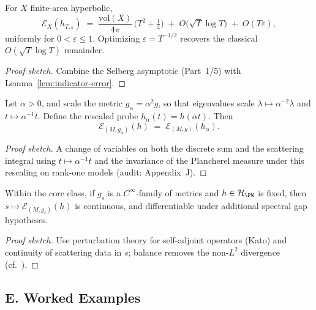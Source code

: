 \begin{theorem}
\label{thm:balanced-selberg}
For $X$ finite-area hyperbolic,
\[
  \mathcal E_X(h_{T,\varepsilon})
  \;=\; \frac{\mathrm{vol}(X)}{4\pi}\,\big(T^2+\tfrac14\big)
  \;+\; O\!\big(\sqrt{T}\log T\big) \;+\; O(T\varepsilon),
\]
uniformly for $0<\varepsilon\le 1$. Optimizing $\varepsilon=T^{-1/2}$ recovers the classical $O(\sqrt{T}\log T)$ remainder. 
\end{theorem}

\begin{proof}[Proof sketch]
Combine the Selberg asymptotic (Part~1/5) with Lemma~\ref{lem:indicator-error}.
\end{proof}

\begin{theorem}
\label{thm:dilation}
Let $\alpha>0$, and scale the metric $g_\alpha=\alpha^2 g$, so that eigenvalues scale $\lambda\mapsto \alpha^{-2}\lambda$ and $t\mapsto \alpha^{-1} t$.
Define the rescaled probe $h_\alpha(t)=h(\alpha t)$. Then
\[
  \mathcal E_{(M,g_\alpha)}(h)
  \;=\; \mathcal E_{(M,g)}(h_\alpha).
\]
\end{theorem}

\begin{proof}[Proof sketch]
A change of variables on both the discrete sum and the scattering integral using $t\mapsto \alpha^{-1}t$ and the invariance of the Plancherel measure under this rescaling on rank-one models (audit: Appendix~J).
\end{proof}

\begin{theorem}
\label{thm:stability}
Within the core class, if $g_s$ is a $C^\infty$-family of metrics and $h\in\mathcal H_{\PW}$ is fixed, then $s\mapsto \mathcal E_{(M,g_s)}(h)$ is continuous, and differentiable under additional spectral gap hypotheses.
\end{theorem}

\begin{proof}[Proof sketch]
Use perturbation theory for self-adjoint operators (Kato) and continuity of scattering data in $s$; balance removes the non-$L^2$ divergence (cf.\ \cite{Iwaniec2002}).
\end{proof}


\subsection*{E. Worked Examples}
\label{subsec:examples}

